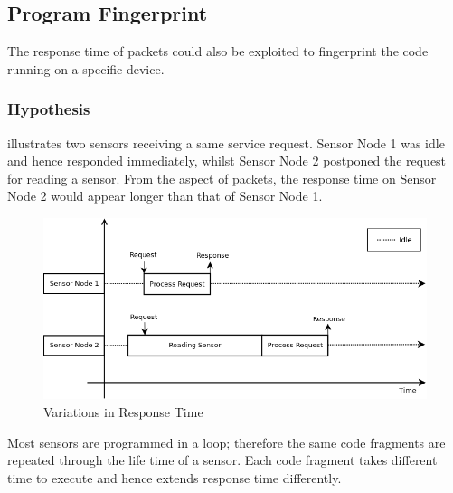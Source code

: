 \subsection{Program Fingerprint}
The response time of packets could also be exploited to fingerprint the code running on a specific device. 

\subsubsection{Hypothesis}
 illustrates two sensors receiving a same service request. Sensor Node 1 was idle and hence responded immediately, whilst Sensor Node 2 postponed the request for reading a sensor. From the aspect of packets, the response time on Sensor Node 2 would appear longer than that of Sensor Node 1.

\begin{figure}
	\center
	\includegraphics[width=\textwidth]{fig/PingProbe_Theory.png}
	\caption{Variations in Response Time\label{FingerprintTheory}}
\end{figure}

Most sensors are programmed in a loop; therefore the same code fragments are repeated through the life time of a sensor. Each code fragment takes different time to execute and hence extends response time differently. 

